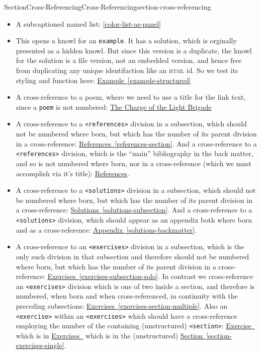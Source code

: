 \documentclass[twoside,10pt,]{article}
\newcommand{\xreffont}{\relax}
\newcommand{\mono}[1]{\texttt{#1}}
\newcommand{\initialism}[1]{\textsc{\MakeLowercase{#1}}}
\numberwithin{equation}{section}
\begin{document}
\begin{sectionptx}{Section}{Cross-Referencing}{}{Cross-Referencing}{}{}{section-cross-referencing}
\begin{itemize}[label=\textbullet]
\item{}A subcaptioned named list: \hyperref[color-list-as-panel]{{\xreffont\ref{color-list-as-panel}}}%
\item{}This opens a knowl for an \mono{example}.  It has a solution, which is orginally presented as a hidden knowl.  But since this version is a duplicate, the knowl for the solution is a file version, not an embedded version, and hence free from duplicating any unique identifaction like an \initialism{HTML} id.  So we test its styling and function here: \hyperref[example-structured]{Example~{\xreffont\ref{example-structured}}}%
\item{}A cross-reference to a poem, where we need to use a title for the link text, since a \mono{poem} is not numbered: \hyperref[poem-light-brigade]{The Charge of the Light Brigade}%
\item{}A cross-reference to a \mono{<references>} division in a subsection, which should not be numbered where born, but which has the number of its parent division in a cross-reference: \hyperref[references-section]{References~{\xreffont\ref{references-section}}}.  And a cross-reference to a \mono{<references>} division, which is the ``main'' bibliography in the back matter, and so is not numbered where born, nor in a cross-reference (which we must accomplish via it's title): \hyperlink{references-backmatter}{References}.%
\item{}A cross-reference to a \mono{<solutions>} division in a subsection, which should not be numbered where born, but which has the number of its parent division in a cross-reference: \hyperref[solutions-subsection]{Solutions~{\xreffont\ref{solutions-subsection}}}.  And a cross-reference to a \mono{<solutions>} division, which should appear as an appendix both where born and as a cross-reference: \hyperref[solutions-backmatter]{Appendix~{\xreffont\ref{solutions-backmatter}}}.%
\item{}A cross-reference to an \mono{<exercises>} division in a subsection, which is the only such division in that subsection and therefore should not be numbered where born, but which has the number of its parent division in a cross-reference: \hyperref[exercises-subsection-solo]{Exercises~{\xreffont\ref{exercises-subsection-solo}}}.  In contrast we cross-reference an \mono{<exercises>} division which is one of two inside a section, and therefore is numbered, when born and when cross-referenced, in continuity with the preceding subsections: \hyperref[exercises-section-multiple]{Exercises~{\xreffont\ref{exercises-section-multiple}}}.  Also an \mono{<exercise>} within an \mono{<exercises>} which should have a cross-reference employing the number of the containing (unstructured) \mono{<section>}: \hyperlink{duplicate-divisional}{Exercise~{\xreffont 37.2}} which is in \hyperlink{exercise-collection}{Exercises~{\xreffont 37}} which is in the (unstructured) \hyperref[section-exercises-single]{Section~{\xreffont\ref{section-exercises-single}}}.%

\end{itemize}
\end{sectionptx}
\end{document}
